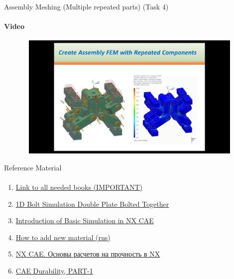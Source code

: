 \documentclass[aspectratio=169]{beamer}
\newcommand{\fbckg}[1]{\usebackgroundtemplate{\texttt{[image: \#1]}}}%
\begin{document}
\begin{frame}[t]{Assembly Meshing (Multiple repeated parts) (Task 4)}
    \framesubtitle{Video}
    \vspace{-0.6cm}
    \begin{figure}[H]
        \href{https://youtu.be/PCvw1kOc5oE}{
            \centering\includegraphics[height=6cm,width=1\textwidth,keepaspectratio]{assembly_meshing_video.jpg}}
        \label{fig:assembly_meshing_video.jpg}
    \end{figure}
\end{frame}

\begin{frame}[t]{Reference Material}
    \framesubtitle{}
    \begin{enumerate}
        \item \href{https://disk.yandex.ru/d/Q6H7la7iLdeh5Q}{Link to all needed books (IMPORTANT)}
        \item \href{https://youtu.be/vBilPNT2POM}{1D Bolt Simulation Double Plate Bolted Together}
        \item \href{https://youtu.be/xqBRiOuGGfw}{Introduction of Basic Simulation in NX CAE}
        \item \href{https://youtu.be/e0mKgo4m-kk}{How to add new material (rus)}
        \item \href{https://www.youtube.com/playlist?list=PLrlbZU2HDT4n-BPs-EW9x2PCWBDqmRi5H}{NX CAE. Основы расчетов на прочность в NX}
        \item \href{https://youtu.be/1jJtZCUNQNo}{CAE Durability, PART-1}
    \end{enumerate}
    \end{frame}

\fbckg{fibeamer/figs/last_page.png}
\frame[plain]{}
\end{document}
